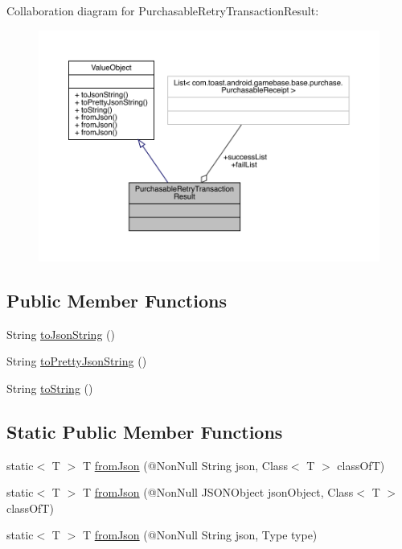 Collaboration diagram for Purchasable\+Retry\+Transaction\+Result\+:\nopagebreak
\begin{figure}[H]
\begin{center}
\leavevmode
\includegraphics[width=350pt]{classcom_1_1toast_1_1android_1_1gamebase_1_1base_1_1purchase_1_1_purchasable_retry_transaction_result__coll__graph}
\end{center}
\end{figure}
\subsection*{Public Member Functions}
\begin{DoxyCompactItemize}
\item 
String \hyperlink{classcom_1_1toast_1_1android_1_1gamebase_1_1base_1_1_value_object_a58acf6402880e9769d79d8667581fa6a}{to\+Json\+String} ()
\item 
String \hyperlink{classcom_1_1toast_1_1android_1_1gamebase_1_1base_1_1_value_object_a054431f3d988a22295cfc8b784ff2637}{to\+Pretty\+Json\+String} ()
\item 
String \hyperlink{classcom_1_1toast_1_1android_1_1gamebase_1_1base_1_1_value_object_ad146fa8579a5f8a876c4688cc5a68520}{to\+String} ()
\end{DoxyCompactItemize}
\subsection*{Static Public Member Functions}
\begin{DoxyCompactItemize}
\item 
static$<$ T $>$ T \hyperlink{classcom_1_1toast_1_1android_1_1gamebase_1_1base_1_1_value_object_ae6655c88c20a9a8406dc11b46250ac7b}{from\+Json} (@Non\+Null String json, Class$<$ T $>$ class\+OfT)
\item 
static$<$ T $>$ T \hyperlink{classcom_1_1toast_1_1android_1_1gamebase_1_1base_1_1_value_object_ab83c4196ee2e3f11553bbe0f04dc2101}{from\+Json} (@Non\+Null J\+S\+O\+N\+Object json\+Object, Class$<$ T $>$ class\+OfT)
\item 
static$<$ T $>$ T \hyperlink{classcom_1_1toast_1_1android_1_1gamebase_1_1base_1_1_value_object_aa901d97d495150b54bcb80c05672f58a}{from\+Json} (@Non\+Null String json, Type type)
\end{DoxyCompactItemize}
